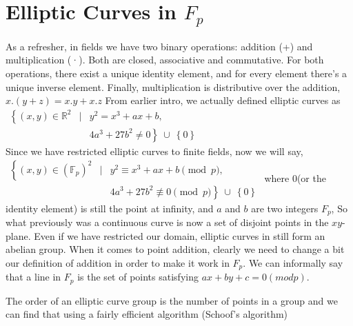 \documentclass[12pt,letterpaper]{article}
\begin{document}
\section{Elliptic Curves in $F_p$}
As a refresher, in fields we have two binary operations: addition (+) and multiplication (·). Both are closed, associative and commutative. For both operations, there exist a unique identity element, and for every element there's a unique inverse element. Finally, multiplication is distributive over the addition, $x.(y+z)=x.y+x.z$
From earlier intro, we actually defined elliptic curves as  $\begin{array}{rcl}
  \left\{(x, y) \in \mathbb{R}^2 \right. & \left. | \right. & \left. y^2 = x^3 + ax + b, \right. \\
  & & \left. 4a^3 + 27b^2 \ne 0\right\}\ \cup\ \left\{0\right\}
\end{array}$\\
Since we have restricted elliptic curves to finite fields, now we will say, \\
$\begin{array}{rcl}
  \left\{(x, y) \in (\mathbb{F}_p)^2 \right. & \left. | \right. & \left. y^2 \equiv x^3 + ax + b \pmod{p}, \right. \\
  & & \left. 4a^3 + 27b^2 \not\equiv 0 \pmod{p}\right\}\ \cup\ \left\{0\right\}
\end{array}$ where 0(or the identity element) is still the point at infinity, and $a$ and $b$  are two integers $F_p$, So what previously was a continuous curve is now a set of disjoint points in the $xy$-plane. Even if we have restricted our domain, elliptic curves in still form an abelian group. When it comes to point addition, clearly we need to change a bit our definition of addition in order to make it work in $F_p$. We can informally say that a line in $F_p$ is the set of points satisfying $ax+by+c=0(mod p)$.

The order of an elliptic curve group is the number of points in a group and we can find that using a fairly efficient algorithm (Schoof's algorithm)
\end{document}
